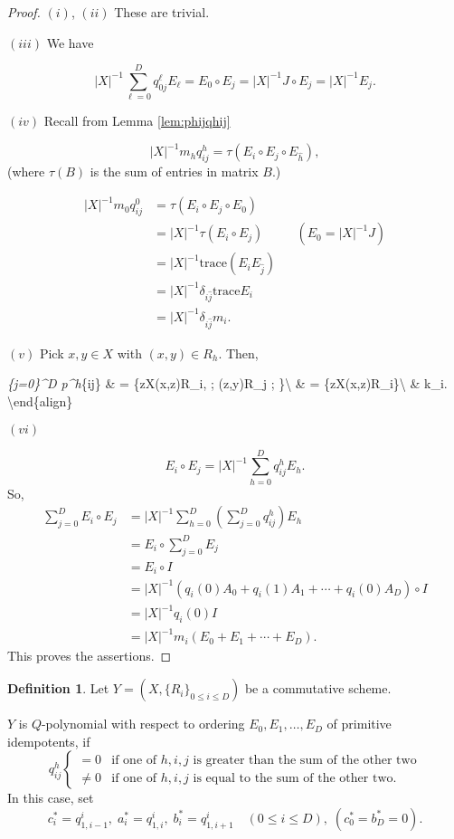 \documentclass[
]{book}
\theoremstyle{definition}
\newtheorem{definition}{Definition}[chapter]
\theoremstyle{definition}
\theoremstyle{definition}
\theoremstyle{definition}
\theoremstyle{remark}
\begin{document}
\begin{proof}
\leavevmode

\((i)\), \((ii)\) These are trivial.

\((iii)\) We have

\[|X|^{-1}\sum_{\ell = 0}^D q^\ell_{0j} E_\ell  = E_0 \circ E_j = |X|^{-1}J\circ E_j = |X|^{-1}E_j.\]

\((iv)\) Recall from Lemma \ref{lem:phijqhij}

\[|X|^{-1}m_h q^h_{ij} = \tau(E_i\circ E_j \circ E_{\hat{h}}),\]
(where \(\tau(B)\) is the sum of entries in matrix \(B\).)

\begin{align}
|X|^{-1}m_0q^0_{ij} & = \tau(E_i\circ E_j\circ E_0) \\
& = |X|^{-1}\tau(E_i\circ E_j) && (E_0 = |X|^{-1}J)\\
& = |X|^{-1}\mathrm{trace}(E_iE_{\hat{j}})\\
& = |X|^{-1}\delta_{i\hat{j}}\mathrm{trace}E_i\\
& = |X|^{-1}\delta_{i\hat{j}}m_i.
\end{align}

\((v)\) Pick \(x,y\in X\) with \((x,y)\in R_h\). Then,

\sum\emph{\{j=0\}\^{}D p\^{}h}\{ij\} \& = \textbar\{z\in X\mid (x,z)\in R\_i, ; (z,y)\in R\_j ; \}\textbackslash{}
\& = \textbar\{z\in X\mid (x,z)\in R\_i\}\textbar\textbackslash{}
\& k\_i.
\textbackslash end\{align\}

\((vi)\)

\[E_i \circ E_j = |X|^{-1}\sum_{h=0}^D q^h_{ij}E_h.\]
So,
\begin{align}
\sum_{j=0}^D E_i\circ E_j & = |X|^{-1}\sum_{h=0}^D \left(\sum_{j=0}^D q^h_{ij}\right) E_h\\
& = E_i \circ \sum_{j=0}^D E_j\\
& = E_i\circ I\\
& = |X|^{-1}(q_i(0)A_0 + q_i(1)A_1 + \cdots + q_i(0)A_D)\circ I\\
& = |X|^{-1}q_i(0)I\\
& = |X|^{-1}m_i(E_0 + E_1 + \cdots + E_D).
\end{align}
This proves the assertions.

\end{proof}

\begin{definition}
\protect\hypertarget{def:q-polynomial}{}\label{def:q-polynomial}Let \(Y = (X, \{R_i\}_{0\leq i\leq D})\) be a commutative scheme.

\(Y\) is \(Q\)-polynomial  with respect to ordering \(E_0, E_1, \ldots, E_D\) of primitive idempotents, if
\[q^h_{ij} \begin{cases} = 0 & \text{if one of $h, i, j$ is greater than the sum of the other two}\\
\neq 0 & \text{if one of $h,i,j$ is equal to the sum of the other two.}\end{cases}\]
In this case, set
\[c^*_i = q^i_{1,i-1}, \; a^*_i = q^i_{1,i}, \; b^*_i = q^i_{1,i+1} \quad (0\leq i\leq D), \;(c^*_0= b^*_D = 0).\]
\end{definition}
\end{document}
